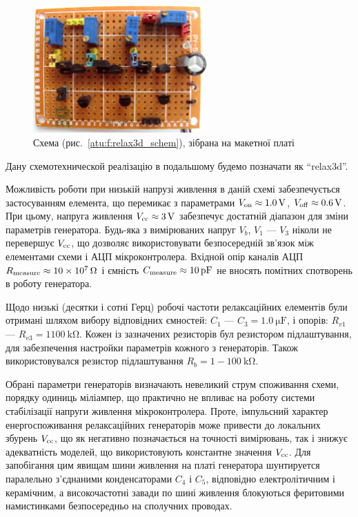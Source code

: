 \begin{figure}[htb!]
  \centerline{\includegraphics[width=0.6\textwidth]{p/relax3d_board.jpg} }
\caption{Схема (рис.~\ref{atu:f:relax3d_schem}), зібрана на макетної платі}
\label{atu:f:relax3d_board}
\end{figure}

Дану схемотехнической реалізацію в подальшому будемо позначати
як ``relax3d''.


Можливість роботи при низькій напрузі живлення в даній
схемі забезпечується застосуванням елемента, що перемикає
з параметрами
$ V _\mathrm{on} \approx \SI{1.0}{\volt} $,
$ V _\mathrm{off} \approx \SI{0.6}{ \volt} $. При цьому, напруга живлення
$ V _\mathrm{cc} \approx \SI{3}{\volt} $ забезпечує достатній діапазон для зміни
параметрів генератора. Будь-яка з вимірюваних напруг
$ V_b $,
$ V_1 $ ---
$ V_3 $ ніколи не перевершує
$ V _\mathrm{cc} $, що дозволяє використовувати безпосередній зв'язок між
елементами схеми і АЦП мікроконтролера. Вхідной опір каналів АЦП
$ R _\mathrm{measure} \approx \SI{10e7}{\ohm} $ і ємність
$ C \Tidx{measure} \approx \SI{10}{\pico \farad} $ не вносять помітних спотворень в
роботу генератора.

Щодо низькі (десятки і сотні Герц) робочі частоти релаксаційних
елементів були отримані шляхом вибору відповідних ємностей:
$C_1 $ --- $ C_3 = \SI{1.0}{\micro \farad} $, і опорів:
$ R_{v1} $ --- $ R_{v3} = 1 \SI{100}{\kilo \ohm} $.
Кожен із зазначених резисторів бул
резистором підлаштування, для забезпечення настройки параметрів кожного
з генераторів. Також використовувался
резистор підлаштування $ R_{b} = 1-\SI{100}{\kilo\ohm}$.

Обрані параметри генераторів визначають невеликий струм
споживання схеми, порядку одиниць міліампер, що практично
не впливає на роботу системи стабілізації напруги живлення
мікроконтролера. Проте, імпульсний характер енергоспоживання
релаксаційних генераторів може привести до локальних збурень
$ V _\mathrm{cc} $, що як негативно позначається на точності вимірювань,
так і знижує адекватність моделей, що використовують константне
значення
$ V _\mathrm{cc} $. Для запобігання цим явищам шини живлення на платі
генератора шунтируется паралельно з'єднаними конденсаторами
$ C_4 $ і
$ C_5 $, відповідно електролітичним і керамічним, а високочастотні
завади по шині живлення блокуються феритовими намистинками
безпосередньо на сполучних проводах.


